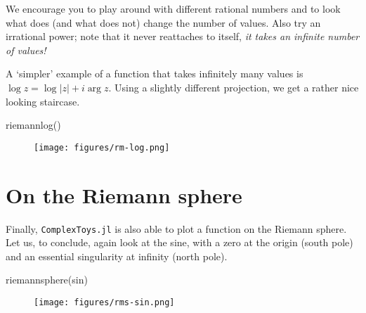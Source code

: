 \documentclass[a4paper]{article}
\begin{document}
We encourage you to play around with different rational numbers and to look what
does (and what does not) change the number of values. Also try an irrational
power; note that it never reattaches to itself, \emph{it takes an infinite
	number of values!}

A `simpler' example of a function that takes infinitely many values is
$\log z = \log |z| + i\arg z$.  Using a slightly different projection, we
get a rather nice looking staircase.

\begin{juliaverbatim}
	riemannlog()
\end{juliaverbatim}
\begin{figure}[H]
	\centering
	\texttt{[image: figures/rm-log.png]}
\end{figure}

\section{On the Riemann sphere}

Finally, \texttt{ComplexToys.jl} is also able to plot a function on the Riemann
sphere.  Let us, to conclude, again look at the sine, with a zero at the origin
(south pole) and an essential singularity at infinity (north pole).

\begin{juliaverbatim}
	riemannsphere(sin)
\end{juliaverbatim}
\begin{figure}[H]
	\centering
	\texttt{[image: figures/rms-sin.png]}
\end{figure}
\end{document}
